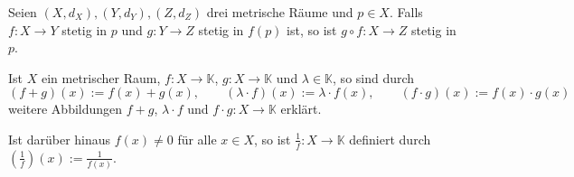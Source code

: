 Seien $(X, d_X), (Y, d_Y), (Z, d_Z)$ drei metrische Räume und $p \in X$. Falls $f: X \to Y$ stetig in $p$ und $g: Y \to Z$ stetig in $f(p)$ ist, so ist $g \circ f: X \to Z$ stetig in $p$.

Ist $X$ ein metrischer Raum, $f: X \to \mathbb{K}$, $g: X \to \mathbb{K}$ und $\lambda \in \mathbb{K}$, so sind durch
$$(f+g)(x) := f(x) + g(x), \qquad (\lambda \cdot f)(x) := \lambda \cdot f(x), \qquad (f \cdot g)(x) := f(x) \cdot g(x)$$
weitere Abbildungen $f+g$, $\lambda \cdot f$ und $f \cdot g: X \to \mathbb{K}$ erklärt.

Ist darüber hinaus $f(x) \neq 0$ für alle $x \in X$, so ist $\frac{1}{f} : X \to \mathbb{K}$ definiert durch $\left(\frac{1}{f}\right)(x) := \frac{1}{f(x)}$.